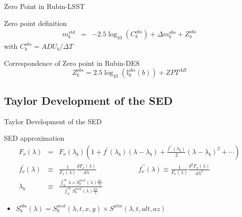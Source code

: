 \documentclass{beamer}
\begin{document}
\begin{frame}{Zero Point in Rubin-LSST}
\begin{exampleblock}{Zero point definition}
\begin{eqnarray}
m_b^{std} & = & -2.5 \log_{10}(C_b^{obs}) + \Delta m_b^{obs} + Z_b^{obs}
\end{eqnarray}
with $C_b^{obs} = ADU_b/\Delta T$
\end{exampleblock}
\begin{alertblock}{Correspondence of Zero point in Rubin-DES}
\begin{equation}
Z_b^{obs} = 2.5\log_{10}\left(\mathbb{I}_0^{obs}(b)\right) + ZPT^{AB}
\end{equation}
\end{alertblock}
\end{frame}


\subsection{Taylor Development of the SED}
\begin{frame}{Taylor Development of the SED} 
\begin{exampleblock}{SED approximation}
\begin{eqnarray}
F_\nu(\lambda) & = & F_\nu(\lambda_b) \left(1 + f^\prime(\lambda_b)(\lambda-\lambda_b) + \frac{f^{\prime\prime}(\lambda_b)}{2}(\lambda-\lambda_b)^2 + \cdots \right) \\
f_\nu^\prime(\lambda) & \equiv & \frac{1}{F_\nu(\lambda)}\frac{dF_\nu(\lambda)}{d\lambda} \qquad \qquad \qquad
f_\nu^{\prime\prime}(\lambda)  \equiv  \frac{1}{F_\nu(\lambda)}\frac{d^2F_\nu(\lambda)}{d\lambda^2} \nonumber \\
\lambda_b & \equiv & \frac{\int_0^{\infty} \lambda \times S_b^{inst}(\lambda) \frac{d\lambda}{\lambda}}
{\int_0^{\infty} S_b^{inst}(\lambda) \frac{d\lambda}{\lambda}}
\end{eqnarray}
\begin{itemize}
\item $S_b^{obs}(\lambda) = S_b^{inst}(\lambda,t,x,y) \times S^{atm}(\lambda,t,alt,az)$
\end{itemize}
\end{exampleblock}
\end{frame}
\end{document}
